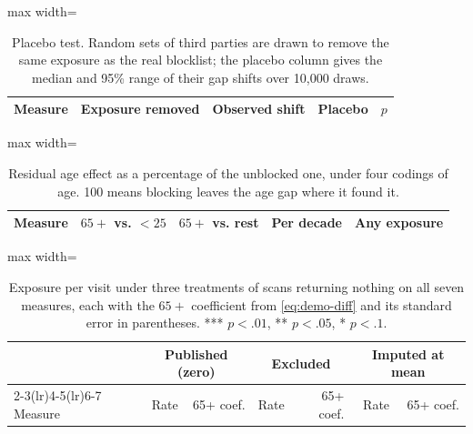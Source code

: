 \documentclass[12pt, letterpaper]{article}
\begin{document}
\begin{table}[ht]
\centering
\caption{Placebo test. Random sets of third parties are drawn to remove the same exposure as the real blocklist; the placebo column gives the median and 95\% range of their gap shifts over 10{,}000 draws.}
\label{tab:blocking_placebo}
\begin{adjustbox}{max width=\textwidth}
\begin{tabular}{lrrrr}
\toprule
Measure & Exposure removed & Observed shift & Placebo & $p$ \\
\midrule

\bottomrule
\end{tabular}
\end{adjustbox}
\end{table}

\begin{table}[ht]
\centering
\caption{Residual age effect as a percentage of the unblocked one, under four codings of age. 100 means blocking leaves the age gap where it found it.}
\label{tab:robustness_age_coding}
\begin{adjustbox}{max width=\textwidth}
\begin{tabular}{lrrrr}
\toprule
Measure & $65+$ vs. $<25$ & $65+$ vs. rest & Per decade & Any exposure \\
\midrule

\bottomrule
\end{tabular}
\end{adjustbox}
\end{table}

\begin{table}[ht]
\centering
\caption{Exposure per visit under three treatments of scans returning nothing on all seven measures, each with the $65+$ coefficient from \cref{eq:demo-diff} and its standard error in parentheses. *** $p<.01$, ** $p<.05$, * $p<.1$.}
\label{tab:allzero_sensitivity}
\begin{adjustbox}{max width=\textwidth}
\begin{tabular}{lrrrrrr}
\toprule
& \multicolumn{2}{c}{Published (zero)} & \multicolumn{2}{c}{Excluded}
& \multicolumn{2}{c}{Imputed at mean} \\
\cmidrule(lr){2-3}\cmidrule(lr){4-5}\cmidrule(lr){6-7}
Measure & Rate & 65+ coef. & Rate & 65+ coef. & Rate & 65+ coef. \\
\midrule

\bottomrule
\end{tabular}
\end{adjustbox}
\end{table}
\end{document}
